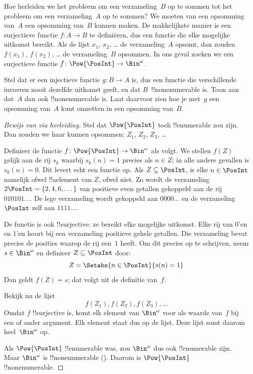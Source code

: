 \documentclass[openany]{memoir}
\begin{document}
Hoe herleiden we het probleem om een verzameling~$B$ op te sommen tot
het probleem om een verzameling~$A$ op te sommen? We moeten van een
opsomming van~$A$ een opsomming van~$B$ kunnen maken. De makkelijkste
manier is een surjectieve functie $f\colon A \to B$ te definiëren,
dus een functie die elke mogelijke uitkomst bereikt. Als de lijst $x_1$,
$x_2$, \dots{} de verzameling~$A$ opsomt, dan zouden $f(x_1)$, $f(x_2)$,
\dots{} de verzameling~$B$ opsommen. In ons geval zoeken we een
surjectieve functie $f\colon \Pow{\PosInt} \to \Bin^\omega$.

\begin{prob}
Stel dat er een injectieve functie $g\colon B \to A$ is, dus een
functie die verschillende invoeren nooit dezelfde uitkomst geeft, en
dat $B$~!!{nonenumerable} is. Toon aan dat~$A$ dan ook
!!{nonenumerable} is. Laat daarvoor zien hoe je met~$g$ een opsomming
van~$A$ kunt omzetten in een opsomming van~$B$.
\end{prob}

\begin{proof}[Bewijs van {} via herleiding]
Stel dat $\Pow{\PosInt}$ toch !!{enumerable} zou zijn. Dan zouden we
haar kunnen opsommen: $Z_{1}$, $Z_{2}$, $Z_{3}$, \dots

Definieer de functie $f \colon \Pow{\PosInt} \to \Bin^\omega$ als
volgt. We stellen $f(Z)$ gelijk aan de rij $s_{k}$ waarbij $s_{k}(n) =
1$ precies als $n \in Z$; in alle andere gevallen is $s_k(n) = 0$.
Dit levert echt een functie op. Als $Z \subseteq \PosInt$, is elke $n
\in \PosInt$ namelijk ofwel !!a{element} van $Z$, ofwel niet. Zo wordt
de verzameling $2\PosInt = \{2, 4, 6, \dots\}$ van positieve even
getallen gekoppeld aan de rij $010101\dots$. De lege verzameling wordt
gekoppeld aan $0000\dots$ en de verzameling $\PosInt$ zelf aan
$1111\dots$.

De functie is ook !!{surjective}: ze bereikt elke mogelijke uitkomst.
Elke rij van $0$'en en $1$'en hoort bij een verzameling positieve gehele
getallen. Die verzameling bevat precies de posities
waarop de rij een~$1$ heeft. Om dit precies op te schrijven, neem
$s \in \Bin^\omega$ en definieer $Z \subseteq \PosInt$ door:
\[
Z = \Setabs{n \in \PosInt}{s(n) = 1}
\]
Dan geldt $f(Z) = s$; dat volgt uit de definitie van~$f$.

Bekijk nu de lijst
\[
f(Z_1), f(Z_2), f(Z_3), \dots
\]
Omdat $f$ !!{surjective} is, komt elk element van $\Bin^\omega$ voor
als waarde van~$f$ bij een of ander argument. Elk element staat dus op
de lijst. Deze lijst somt daarom heel~$\Bin^\omega$ op.

Als $\Pow{\PosInt}$ !!{enumerable} was, zou $\Bin^\omega$ dus ook
!!{enumerable} zijn. Maar $\Bin^\omega$ is !!{nonenumerable}
(). Daarom is $\Pow{\PosInt}$
!!{nonenumerable}.
\end{proof}
\end{document}
